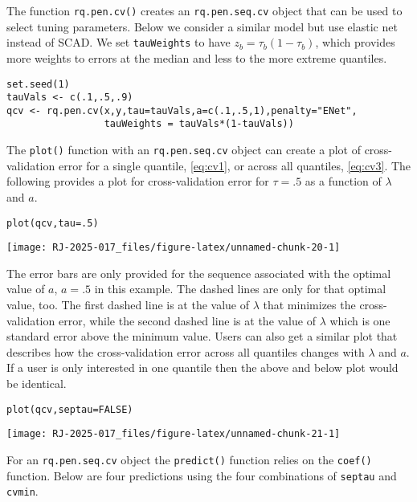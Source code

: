 The function \texttt{rq.pen.cv()} creates an \texttt{rq.pen.seq.cv} object that can be used to select tuning parameters. Below we consider a similar model but use elastic net instead of SCAD. We set \texttt{tauWeights} to have \(z_b=\tau_b(1-\tau_b)\), which provides more weights to errors at the median and less to the more extreme quantiles.

\begin{verbatim}
set.seed(1)
tauVals <- c(.1,.5,.9)
qcv <- rq.pen.cv(x,y,tau=tauVals,a=c(.1,.5,1),penalty="ENet",
                 tauWeights = tauVals*(1-tauVals))
\end{verbatim}

The \texttt{plot()} function with an \texttt{rq.pen.seq.cv} object can create a plot of cross-validation error for a single quantile, \eqref{eq:cv1}, or across all quantiles, \eqref{eq:cv3}. The following provides a plot for cross-validation error for \(\tau=.5\) as a function of \(\lambda\) and \(a\).

\begin{verbatim}
plot(qcv,tau=.5)
\end{verbatim}

\begin{center}\texttt{[image: RJ-2025-017\_files/figure-latex/unnamed-chunk-20-1]} \end{center}

The error bars are only provided for the sequence associated with the optimal value of \(a\), \(a=.5\) in this example. The dashed lines are only for that optimal value, too. The first dashed line is at the value of \(\lambda\) that minimizes the cross-validation error, while the second dashed line is at the value of \(\lambda\) which is one standard error above the minimum value. Users can also get a similar plot that describes how the cross-validation error across all quantiles changes with \(\lambda\) and \(a\). If a user is only interested in one quantile then the above and below plot would be identical.

\begin{verbatim}
plot(qcv,septau=FALSE)
\end{verbatim}

\begin{center}\texttt{[image: RJ-2025-017\_files/figure-latex/unnamed-chunk-21-1]} \end{center}

For an \texttt{rq.pen.seq.cv} object the \texttt{predict()} function relies on the \texttt{coef()} function. Below are four predictions using the four combinations of \texttt{septau} and \texttt{cvmin}.

